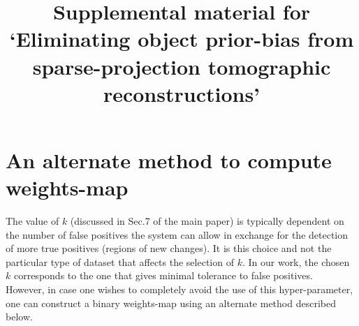 \documentclass{article}
\title{Supplemental material for `Eliminating object prior-bias from sparse-projection
tomographic reconstructions'}
\begin{document}
\maketitle

\tableofcontents
\newpage
\section{An alternate method to compute weights-map}
The value of $k$ (discussed in Sec.7 of the main paper) is typically dependent on the number of false positives the system can allow in exchange for the detection of more true positives (regions of new changes). It is this choice and not the particular type of dataset that affects the selection of $k$. In our work, the chosen $k$ corresponds to the one that gives minimal tolerance to false positives.\\

However, in case one wishes to completely avoid the use of this hyper-parameter, one can construct a binary weights-map using an alternate method described below.
\end{document}
